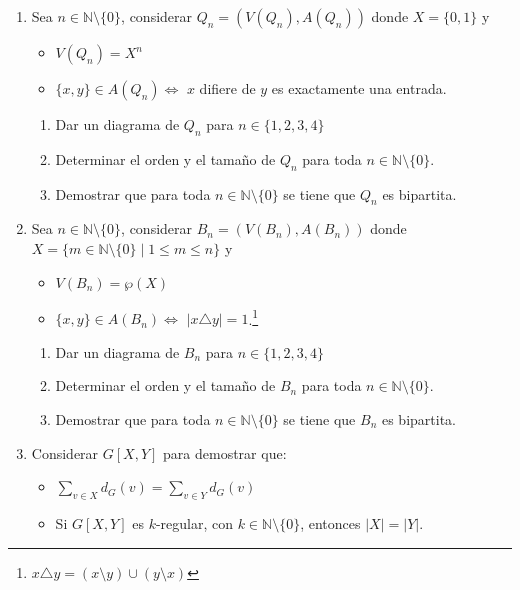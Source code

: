 \documentclass[10pt]{report}
\numberwithin{section}{chapter}
\newcommand{\N}{\mathbb N}
\begin{document}
\begin{enumerate}

\item Sea $n \in \N \setminus \{0\}$, considerar $Q_n = (V(Q_n), A(Q_n))$ donde $X=\{0,1\}$ y
\begin{itemize}
\item $V(Q_n) = X^n $
\item $\{x,y\} \in A(Q_n) \Leftrightarrow$ $x$ difiere de $y$ es exactamente una entrada. 
\end{itemize}
\begin{enumerate}
\item Dar un diagrama de $Q_n$ para $n \in \{1,2,3,4\}$
\item Determinar el orden y el tamaño de $Q_n$ para toda $n \in \N \setminus \{0\}$.
\item Demostrar que para toda $n \in \N \setminus \{0\}$ se tiene que $Q_n$ es bipartita.
\end{enumerate}

\newpage

\item Sea $n \in \N \setminus \{0\}$, considerar $B_n = (V(B_n), A(B_n))$ donde $X=\{m \in \N \setminus \{0\} \; | \; 1 \leq m \leq n\}$ y
\begin{itemize}
\item $V(B_n) = \wp(X) $
\item $\{x,y\} \in A(B_n) \Leftrightarrow$ $|x \triangle y|=1$.\footnote{$x \triangle y = (x \setminus y) \cup (y \setminus x)$}
\end{itemize}
\begin{enumerate}
\item Dar un diagrama de $B_n$ para $n \in \{1,2,3,4\}$
\item Determinar el orden y el tamaño de $B_n$ para toda $n \in \N \setminus \{0\}$.
\item Demostrar que para toda $n \in \N \setminus \{0\}$ se tiene que $B_n$ es bipartita.
\end{enumerate}

\item Considerar $G[X,Y]$ para demostrar que:
\begin{itemize}
\item $\mathop \sum \limits_{v \in X} d_G(v) = \mathop \sum \limits_{v \in Y} d_G(v)$
\item Si $G[X,Y]$ es $k$-regular, con $k \in \N \setminus \{0\}$, entonces $|X| =|Y|$. 
\end{itemize}



\end{enumerate}
\end{document}
